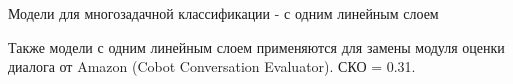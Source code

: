 \begin{frame}{Модели для многозадачной классификации - с одним линейным слоем}
\begin{table}[htbp]
\caption{Точность на различных задачах для разных типов однозадачных моделей, в сравнении с многозадачными. }
\end{table}
Также модели с одним линейным слоем применяются для замены модуля оценки диалога от Amazon (Cobot Conversation Evaluator). СКО = 0.31.

\end{frame}



